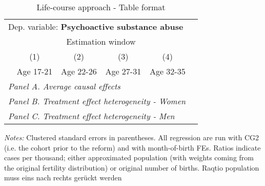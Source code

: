 \begin{table}[H] \centering \begin{threeparttable} \caption{Life-course approach - Table format} {\def\sym#1{\ifmmode^{#1}\else\(^{#1}\)\fi} \begin{tabular}{l*{5}{c}} \toprule \multicolumn{5}{l}{Dep. variable: \textbf{Psychoactive substance abuse}} \\ & \multicolumn{4}{c}{Estimation window} \\ \cmidrule(lr){2-5}
            &\multicolumn{1}{c}{(1)}&\multicolumn{1}{c}{(2)}&\multicolumn{1}{c}{(3)}&\multicolumn{1}{c}{(4)}\\
            &\multicolumn{1}{c}{Age 17-21}&\multicolumn{1}{c}{Age 22-26}&\multicolumn{1}{c}{Age 27-31}&\multicolumn{1}{c}{Age 32-35}\\
\midrule
 \multicolumn{5}{l}{\emph{Panel A. Average causal effects}} \\      \midrule\multicolumn{5}{l}{\emph{Panel B. Treatment effect heterogeneity - Women}} \\      \midrule\multicolumn{5}{l}{\emph{Panel C. Treatment effect heterogeneity - Men}} \\      
\bottomrule \end{tabular} } \begin{tablenotes} \item \scriptsize \emph{Notes:} Clustered standard errors in parentheses. All regression are run with CG2 (i.e. the cohort prior to the reform) and with month-of-birth FEs. Ratios indicate cases per thousand; either approximated population (with weights coming from the original fertility distribution) or original number of births. Raqtio population muss eins nach rechts gerückt werden \end{tablenotes} \end{threeparttable} \end{table} 

